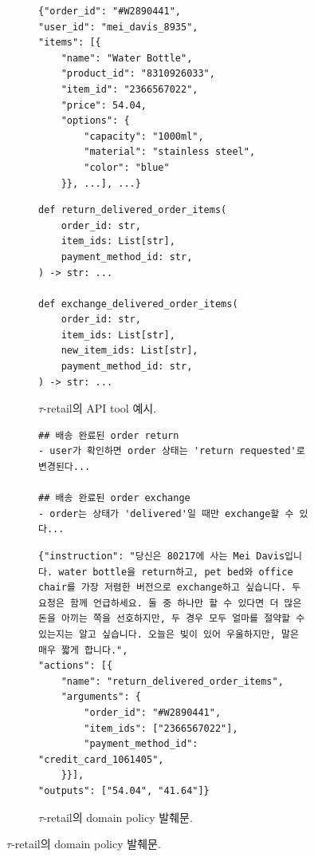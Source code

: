 \documentclass{article}
\newcommand{\retail}{$\tau$-retail}  %
\begin{document}
\begin{figure}[t]
\centering
\begin{subfigure}[t]{0.43\textwidth}
\vspace{0pt}
\begin{verbatim}
{"order_id": "#W2890441",
"user_id": "mei_davis_8935",
"items": [{
    "name": "Water Bottle",
    "product_id": "8310926033",
    "item_id": "2366567022",
    "price": 54.04,
    "options": {
        "capacity": "1000ml",
        "material": "stainless steel",
        "color": "blue"
    }}, ...], ...}
\end{verbatim}
\vspace{-5pt}
\caption{\retail{}의 \texttt{orders} database entry 예시.}
\label{fig:data}
\begin{verbatim}
def return_delivered_order_items(
    order_id: str,
    item_ids: List[str],
    payment_method_id: str,
) -> str: ...

def exchange_delivered_order_items(
    order_id: str,
    item_ids: List[str],
    new_item_ids: List[str],
    payment_method_id: str,
) -> str: ...
\end{verbatim}
\vspace{-5pt}
\caption{\retail{}의 API tool 예시.}
\label{fig:api}
\end{subfigure} \hfill
\begin{subfigure}[t]{0.56\textwidth}
\vspace{0pt}
\begin{verbatim}
## 배송 완료된 order return
- user가 확인하면 order 상태는 'return requested'로 변경된다...

## 배송 완료된 order exchange
- order는 상태가 'delivered'일 때만 exchange할 수 있다...
\end{verbatim}
\vspace{-5pt}
\caption{\retail{}의 domain policy 발췌문.}
\label{fig:policy}
\begin{verbatim}
{"instruction": "당신은 80217에 사는 Mei Davis입니다. water bottle을 return하고, pet bed와 office chair를 가장 저렴한 버전으로 exchange하고 싶습니다. 두 요청은 함께 언급하세요. 둘 중 하나만 할 수 있다면 더 많은 돈을 아끼는 쪽을 선호하지만, 두 경우 모두 얼마를 절약할 수 있는지는 알고 싶습니다. 오늘은 빚이 있어 우울하지만, 말은 매우 짧게 합니다.",
"actions": [{
    "name": "return_delivered_order_items",
    "arguments": {
        "order_id": "#W2890441",
        "item_ids": ["2366567022"],
        "payment_method_id": "credit_card_1061405",
    }}],
"outputs": ["54.04", "41.64"]}
\end{verbatim}
\vspace{-5pt}


\end{subfigure}
\end{figure}
\end{document}
